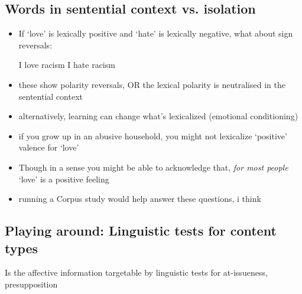 \documentclass[12pt,letterpaper,table,svgnames,dvipsnames]{article}
\begin{document}
\subsection{Words in sentential context vs. isolation}


\begin{itemize}
    \item If `love' is lexically positive and `hate' is lexically negative, what about sign reversals:
        \begin{exe}
            \ex I love racism 
            \ex I hate racism
        \end{exe}
    
    \item these show polarity reversals, OR the lexical polarity is neutralised in the sentential context

    \item alternatively, learning can change what's lexicalized (emotional conditioning)

    \item if you grow up in an abusive household, you might not lexicalize `positive' valence for `love'

    \item Though in a sense you might be able to acknowledge that, \emph{for most people} `love' is a positive feeling 


    \item running a Corpus study would help answer these questions, i think

\end{itemize}





\subsection{Playing around: Linguistic tests for content types}

Is the affective information targetable by linguistic tests for at-issueness, presupposition
\end{document}
